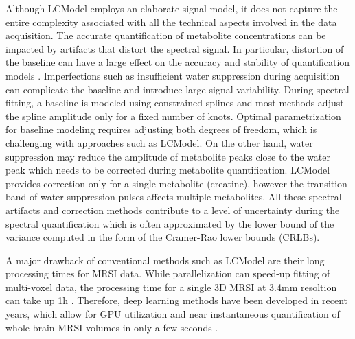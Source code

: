\documentclass{article}
\begin{document}
    Although LCModel employs an elaborate signal model, it does not capture the entire complexity associated with all the technical aspects involved in the data acquisition. The accurate quantification of metabolite concentrations can be impacted by artifacts that distort the spectral signal. In particular, distortion of the baseline can have a large effect on the accuracy and stability of quantification models \cite{near2021preprocessing, cudalbu2021contribution}. Imperfections such as insufficient water suppression during acquisition can complicate the baseline and introduce large signal variability. During spectral fitting, a baseline is modeled using constrained splines and most methods adjust the spline amplitude only for a fixed number of knots. Optimal parametrization for baseline modeling requires adjusting both degrees of freedom, which is challenging with approaches such as LCModel. On the other hand, water suppression may reduce the amplitude of metabolite peaks close to the water peak which needs to be corrected during metabolite quantification. LCModel provides correction only for a single metabolite (creatine), however the transition band of water suppression pulses affects multiple metabolites. All these spectral artifacts and correction methods contribute to a level of uncertainty during the spectral quantification which is often approximated by the lower bound of the variance computed in the form of the Cramer-Rao lower bounds (CRLBs). 
    
    A major drawback of conventional methods such as LCModel are their long processing times for MRSI data. While parallelization can speed-up fitting of multi-voxel data, the processing time for a single 3D MRSI at 3.4mm resoltion can take up 1h \cite{weiser2025deep}. Therefore, deep learning methods have been developed in recent years, which allow for GPU utilization and near instantaneous quantification of whole-brain MRSI volumes in only a few seconds \cite{gurbani2019incorporation}.
    
\end{document}
